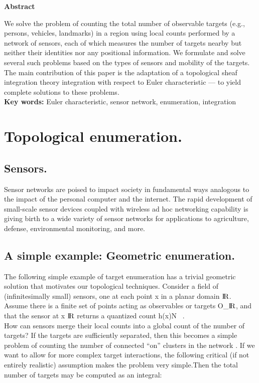 \documentclass{article}
\begin{document}
\textbf{Abstract} \\
\begin{flushleft}

\normalsize {We solve the problem of counting the total number of observable targets (e.g., persons, vehicles, landmarks) in a region using local counts performed by a network of sensors, each of which measures the number of targets nearby but neither their identities nor any positional information. We formulate and solve several such problems based on the types of sensors and mobility of the targets. The main contribution of this paper is the adaptation of a topological sheaf integration theory integration with respect to Euler characteristic — to yield complete solutions to these problems.}
\\
\textbf{Key words:} Euler characteristic, sensor network, enumeration, integration

\section{Topological enumeration.}
\subsection{Sensors.}

Sensor networks are poised to impact society in fundamental ways analogous to the impact of the personal computer and the internet. The rapid development of small-scale sensor devices coupled with wireless ad hoc networking capability
is giving birth to a wide variety of sensor networks for applications to agriculture, defense, environmental monitoring, and more.
\\

\subsection{A simple example: Geometric enumeration.}
The following simple example of target enumeration has a trivial geometric solution that motivates our topological techniques. Consider a field of (infinitesimally small) sensors, one at each point x in a planar domain  ${\rm I\!R}$. Assume there is a finite set of points acting as observables or targets  O_\alpha \subset  ${\rm I\!R}$, and that the sensor at x \in   ${\rm I\!R}$ returns a quantized count h(x)\in N ~.
\\
\hspace{5mm} How can sensors merge their local counts into a global count of the number of targets? If the targets are sufficiently separated, then this becomes a simple problem of counting the number of connected “on” clusters in the network . If we want
to allow for more complex target interactions, the following critical (if not entirely
realistic) assumption makes the problem very simple.Then the total number of targets may be computed as an integral:

\end{flushleft}
\end{document}
